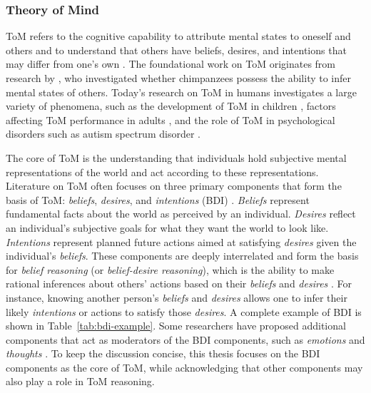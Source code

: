 \subsubsection{Theory of Mind} \label{sssec:theory-of-mind}

\ac{ToM} refers to the cognitive capability to attribute mental states to oneself and others and to understand that others have beliefs, desires, and intentions that may differ from one's own \parencite{Wellman2014}. The foundational work on \ac{ToM} originates from research by \textcite{Premack1978}, who investigated whether chimpanzees possess the ability to infer mental states of others. Today's research on \ac{ToM} in humans investigates a large variety of phenomena, such as the development of \ac{ToM} in children \parencite{Wellman2014}, factors affecting \ac{ToM} performance in adults \parencite{Apperly2009}, and the role of \ac{ToM} in psychological disorders such as autism spectrum disorder \parencite{BaronCohen1995}.

The core of \ac{ToM} is the understanding that individuals hold subjective mental representations of the world and act according to these representations. Literature on \ac{ToM} often focuses on three primary components that form the basis of \ac{ToM}: \textit{beliefs}, \textit{desires}, and \textit{intentions} (BDI) \parencite{Wellman2014}. \textit{Beliefs} represent fundamental facts about the world as perceived by an individual. \textit{Desires} reflect an individual's subjective goals for what they want the world to look like. \textit{Intentions} represent planned future actions aimed at satisfying \textit{desires} given the individual's \textit{beliefs}. These components are deeply interrelated and form the basis for \textit{belief reasoning} (or \textit{belief-desire reasoning}), which is the ability to make rational inferences about others' actions based on their \textit{beliefs} and \textit{desires} \parencite{Wellman2014, Rakoczy2022}. For instance, knowing another person's \textit{beliefs} and \textit{desires} allows one to infer their likely \textit{intentions} or actions to satisfy those \textit{desires}. A complete example of BDI is shown in Table~\ref{tab:bdi-example}. Some researchers have proposed additional components that act as moderators of the BDI components, such as \textit{emotions} and \textit{thoughts} \parencite{Apperly2009}. To keep the discussion concise, this thesis focuses on the BDI components as the core of \ac{ToM}, while acknowledging that other components may also play a role in \ac{ToM} reasoning.

